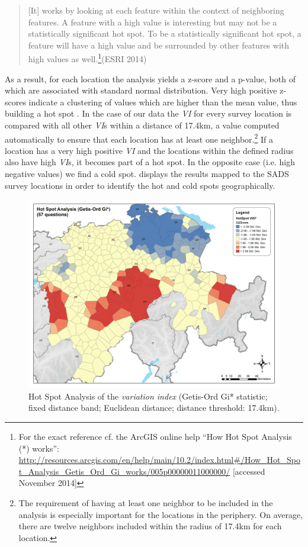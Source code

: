\documentclass[output=paper]{LSP/langsci}
\begin{document}
\begin{quote}[It] works by looking at each feature within the context of neighboring features. A feature with a high value is interesting but may not be a statistically significant hot spot. To be a statistically significant hot spot, a feature will have a high value and be surrounded by other features with high values as well.\footnote{For the exact reference cf. the ArcGIS online help “How Hot Spot Analysis (*) works”: \url{http://resources.arcgis.com/en/help/main/10.2/index.html\#/How\_Hot\_Spot\_Analysis\_Getis\_Ord\_Gi\_works/005p00000011000000/} [accessed November 2014]}(ESRI 2014)
\end{quote}

As a result, for each location the analysis yields a z-score and a p-value, both of which are associated with standard normal distribution. Very high positive z-scores indicate a clustering of values which are higher than the mean value, thus building a hot spot \citep[65]{sibler_visualisierung_2011}. In the case of our data the \emph{VI} for every survey location is compared with all other \emph{VI}s within a distance of 17.4km, a value computed automatically to ensure that each location has at least one neighbor.\footnote{The requirement of having at least one neighbor to be included in the analysis is especially important for the locations in the periphery. On average, there are twelve neighbors included within the radius of 17.4km for each location.} If a location has a very high positive \emph{VI} and the locations within the defined radius also have high \emph{VI}s, it becomes part of a hot spot. In the opposite case (i.e. high negative values) we find a cold spot.  displays the results mapped to the SADS survey locations in order to identify the hot and cold spots geographically.

\begin{figure}[t]
\includegraphics[width=\textwidth]{illustrations/stoeck_fig6}
\caption{Hot Spot Analysis of the \emph{variation index} (Getis-Ord Gi* statistic; fixed distance band; Euclidean distance; distance threshold: 17.4km).}
\label{fig:stoeck:6}
\end{figure}
\end{document}
